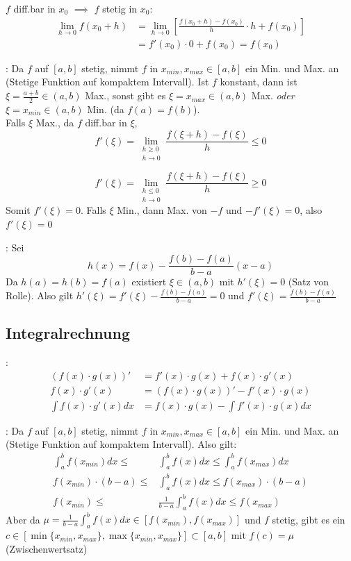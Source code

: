 \Bew $f$ diff.bar in $x_0$ $\implies$ $f$ stetig in $x_0$:
\begin{align*}
    \lim_{h\to 0} f(x_0+h) &= \lim_{h\to 0}\left[\frac{f(x_0+h)-f(x_0)}{h}\cdot h + f(x_0)\right] \\[-0.3em]
    &= f'(x_0)\cdot 0 + f(x_0) = f(x_0)
\end{align*}

\Bew {}: Da $f$ auf $[a, b]$ stetig, nimmt $f$ in $x_{min}, x_{max} \in [a, b]$
ein Min. und Max. an (Stetige Funktion auf kompaktem Intervall).
Ist $f$ konstant, dann ist $\xi = \frac{a + b}{2} \in (a,b)$ Max.,
sonst gibt es $\xi = x_{max} \in (a, b)$ Max. \textit{oder} $\xi = x_{min} \in (a, b)$ Min. (da $f(a) = f(b)$). \\
Falls $\xi$ Max., da $f$ diff.bar in $\xi$,
$$f'(\xi) = \lim_{\substack{h \ge 0 \\ h \to 0}} \frac{f(\xi + h) - f(\xi)}{h} \le 0$$

$$f'(\xi) = \lim_{\substack{h \le 0 \\ h \to 0}} \frac{f(\xi + h) - f(\xi)}{h} \ge 0$$
Somit $f'(\xi) = 0$. Falls $\xi$ Min., dann Max. von $-f$ und $-f'(\xi) = 0$, also $f'(\xi) = 0$

\Bew {}: Sei
$$h(x) = f(x) - \frac{f(b) - f(a)}{b - a} (x- a)$$
Da $h(a) = h(b) = f(a)$ existiert $\xi \in (a, b)$ mit $h'(\xi) = 0$ (Satz von Rolle).
Also gilt $h'(\xi) = f'(\xi) - \frac{f(b) - f(a)}{b - a} = 0$
und $f'(\xi) = \frac{f(b) - f(a)}{b - a}$

\subsection{Integralrechnung}

\Bew {}:
\begin{align*}
    (f(x) \cdot g(x))' &= f'(x)\cdot g(x) + f(x) \cdot g'(x) \\[-0.6em]
    f(x) \cdot g'(x) &= (f(x) \cdot g(x))' - f'(x) \cdot g(x) \\[-0.6em]
    \int f(x) \cdot g'(x) dx &= f(x) \cdot g(x) - \int f'(x) \cdot g(x) dx
\end{align*}

\Bew {}: Da $f$ auf $[a, b]$ stetig, nimmt $f$ in $x_{min}, x_{max} \in [a, b]$
ein Min. und Max. an (Stetige Funktion auf kompaktem Intervall). Also gilt:
\vspace{-0.2em}
\begin{align*}
    \int_a^b f(x_{min}) dx \le &\int_a^b f(x) dx \le \int_a^b f(x_{max}) dx \\[-0.2em]
    f(x_{min}) \cdot (b-a) \le &\int_a^b f(x) dx \le f(x_{max}) \cdot (b-a) \\[-0.2em]
    f(x_{min}) \le &\frac{1}{b-a}\int_a^b f(x) dx \le f(x_{max})
\end{align*}
Aber da $\mu = \displaystyle\frac{1}{b-a}\int_a^b f(x) dx \in [f(x_{min}), f(x_{max})]$ und $f$ stetig,
gibt es ein $c \in [\min\{x_{min}, x_{max}\}, \max\{x_{min}, x_{max}\}] \subset [a, b]$ mit $f(c) = \mu$ (Zwischenwertsatz)

